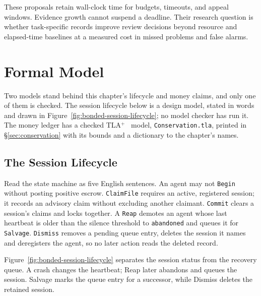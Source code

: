 \documentclass[11pt,a4paper]{article}
\theoremstyle{definition}
\theoremstyle{remark}
\begin{document}
These proposals retain wall-clock time for budgets, timeouts, and appeal
windows. Evidence growth cannot suspend a deadline. Their research question is
whether task-specific records improve review decisions beyond resource and
elapsed-time baselines at a measured cost in missed problems and false alarms.

\section{Formal Model}\label{sec:tlaplus}

Two models stand behind this chapter's lifecycle and money claims, and only
one of them is checked. The session lifecycle below is a design model, stated
in words and drawn in Figure~\ref{fig:bonded-session-lifecycle}; no model
checker has run it. The money ledger has a checked
TLA$^{+}$~ model, \texttt{Conservation.tla},
printed in \S\ref{sec:conservation} with its bounds and a dictionary to the
chapter's names.

\subsection{The Session Lifecycle}

Read the state machine as five English sentences. An agent may not \texttt{Begin} without posting positive escrow. \texttt{ClaimFile} requires an active, registered session; it records an advisory claim without excluding another claimant. \texttt{Commit} clears a session's claims and locks together. A \texttt{Reap} demotes an agent whose last heartbeat is older than the silence threshold to \texttt{abandoned} and queues it for \texttt{Salvage}. \texttt{Dismiss} removes a pending queue entry, deletes the session it names and deregisters the agent, so no later action reads the deleted record.

Figure~\ref{fig:bonded-session-lifecycle} separates the session status from the recovery queue. A crash changes the heartbeat; Reap later abandons and queues the session. Salvage marks the queue entry for a successor, while Dismiss deletes the retained session.


\end{document}
